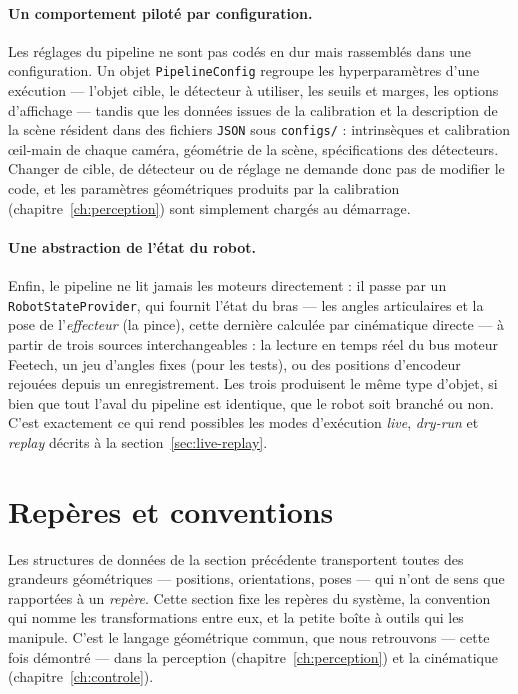 \paragraph{Un comportement piloté par configuration.} Les réglages du pipeline ne sont pas codés en dur mais rassemblés dans une configuration. Un objet \texttt{PipelineConfig} regroupe les hyperparamètres d'une exécution --- l'objet cible, le détecteur à utiliser, les seuils et marges, les options d'affichage --- tandis que les données issues de la calibration et la description de la scène résident dans des fichiers \texttt{JSON} sous \texttt{configs/} : intrinsèques et calibration œil-main de chaque caméra, géométrie de la scène, spécifications des détecteurs. Changer de cible, de détecteur ou de réglage ne demande donc pas de modifier le code, et les paramètres géométriques produits par la calibration (chapitre~\ref{ch:perception}) sont simplement chargés au démarrage.

\paragraph{Une abstraction de l'état du robot.} Enfin, le pipeline ne lit jamais les moteurs directement : il passe par un \texttt{RobotStateProvider}, qui fournit l'état du bras --- les angles articulaires et la pose de l'\emph{effecteur} (la pince), cette dernière calculée par cinématique directe --- à partir de trois sources interchangeables : la lecture en temps réel du bus moteur Feetech, un jeu d'angles fixes (pour les tests), ou des positions d'encodeur rejouées depuis un enregistrement. Les trois produisent le même type d'objet, si bien que tout l'aval du pipeline est identique, que le robot soit branché ou non. C'est exactement ce qui rend possibles les modes d'exécution \emph{live}, \emph{dry-run} et \emph{replay} décrits à la section~\ref{sec:live-replay}.

\section{Repères et conventions}
\label{sec:reperes}

Les structures de données de la section précédente transportent toutes des grandeurs géométriques --- positions, orientations, poses --- qui n'ont de sens que rapportées à un \emph{repère}. Cette section fixe les repères du système, la convention qui nomme les transformations entre eux, et la petite boîte à outils qui les manipule. C'est le langage géométrique commun, que nous retrouvons --- cette fois démontré --- dans la perception (chapitre~\ref{ch:perception}) et la cinématique (chapitre~\ref{ch:controle}).

